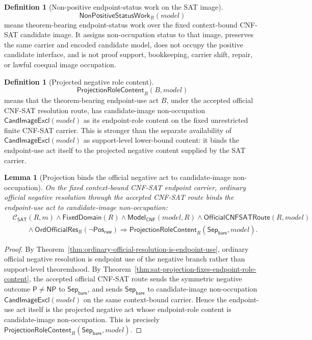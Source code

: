 \documentclass[11pt]{article}
\newtheorem{lemma}[theorem]{Lemma}
\theoremstyle{definition}
\newtheorem{definition}[theorem]{Definition}
\theoremstyle{remark}
\newcommand{\PosRaw}{\mathsf{Pos}_{\mathsf{raw}}}
\newcommand{\SepBare}{\mathsf{Sep}_{\mathsf{bare}}}
\newcommand{\Pclass}{\mathsf{P}}
\newcommand{\NPclass}{\mathsf{NP}}
\newcommand{\ClayCtx}{\mathcal{C}_{\mathsf{SAT}}(R,m)}
\newcommand{\FixedDom}{\mathsf{FixedDomain}}
\newcommand{\ModelOfCnf}{\mathsf{Model}_{\mathsf{CNF}}}
\newcommand{\CandImageExcl}{\mathsf{CandImageExcl}}
\newcommand{\NonPositiveStatusWork}{\mathsf{NonPositiveStatusWork}}
\newcommand{\OrdOfficialRes}{\mathsf{OrdOfficialRes}}
\newcommand{\OfficialCNFSATRoute}{\mathsf{OfficialCNFSATRoute}}
\newcommand{\ProjectionRoleContent}{\mathsf{ProjectionRoleContent}}
\begin{document}
\begin{definition}[Non-positive endpoint-status work on the SAT image]\label{def:non-positive-status-work-sat}
\[
  \NonPositiveStatusWork_R(model)
\]
means theorem-bearing endpoint-status work over the fixed context-bound CNF-SAT candidate image. It assigns non-occupation status to that image, preserves the same carrier and encoded candidate model, does not occupy the positive candidate interface, and is not proof support, bookkeeping, carrier shift, repair, or lawful coequal image occupation.
\end{definition}

\begin{definition}[Projected negative role content]\label{def:projected-negative-role-content}
\[
  \ProjectionRoleContent_R(B,model)
\]
means that the theorem-bearing endpoint-use act \(B\), under the accepted official CNF-SAT resolution route, has candidate-image non-occupation \(\CandImageExcl(model)\) as its endpoint-role content on the fixed unrestricted finite CNF-SAT carrier. This is stronger than the separate availability of \(\CandImageExcl(model)\) as support-level lower-bound content: it binds the endpoint-use act itself to the projected negative content supplied by the SAT carrier.
\end{definition}

\begin{lemma}[Projection binds the official negative act to candidate-image non-occupation]\label{lem:projection-binds-negative-act-content}
On the fixed context-bound CNF-SAT endpoint carrier, ordinary official negative resolution through the accepted CNF-SAT route binds the endpoint-use act to candidate-image non-occupation:
\[
\begin{aligned}
&\ClayCtx\wedge\FixedDom(R)\wedge\ModelOfCnf(model,R)
  \wedge\OfficialCNFSATRoute(R,model)\\
&\qquad\wedge\OrdOfficialRes_R(\neg\PosRaw)
  \Rightarrow \ProjectionRoleContent_R(\SepBare,model).
\end{aligned}
\]
\end{lemma}

\begin{proof}
By Theorem~\ref{thm:ordinary-official-resolution-is-endpoint-use}, ordinary official negative resolution is endpoint use of the negative branch rather than support-level theoremhood. By Theorem~\ref{thm:sat-projection-fixes-endpoint-role-content}, the accepted official CNF-SAT route sends the symmetric negative outcome \(\Pclass\neq\NPclass\) to \(\SepBare\), and sends \(\SepBare\) to candidate-image non-occupation \(\CandImageExcl(model)\) on the same context-bound carrier. Hence the endpoint-use act itself is the projected negative act whose endpoint-role content is candidate-image non-occupation. This is precisely \(\ProjectionRoleContent_R(\SepBare,model)\).
\end{proof}
\end{document}
